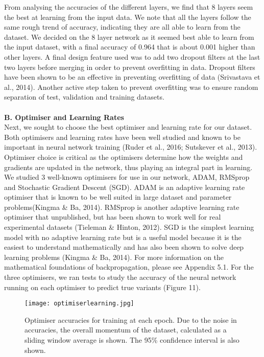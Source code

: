 \documentclass{article}
\begin{document}
From analysing the accuracies of the different layers, we find that 8 layers seem the best at learning from the input data. We note that all the layers follow the same rough trend of accuracy, indicating they are all able to learn from the dataset. We decided on the 8 layer network as it seemed best able to learn from the input dataset, with a final accuracy of 0.964 that is about 0.001 higher than other layers. A final design feature used was to add two dropout filters at the last two layers before merging in order to prevent overfitting in data. Dropout filters have been shown to be an effective in preventing overfitting of data (Srivastava et al., 2014). Another active step taken to prevent overfitting was to ensure random separation of test, validation and training datasets.\\\\
\textbf{B. Optimiser and Learning Rates}\\
Next, we sought to choose the best optimiser and learning rate for our dataset. Both optimisers and learning rates have been well studied and known to be important in neural network training (Ruder et al., 2016; Sutskever et al., 2013). Optimiser choice is critical as the optimisers determine how the weights and gradients are updated in the network, thus playing an integral part in learning. We studied 3 well-known optimisers for use in our network, ADAM, RMSprop and Stochastic Gradient Descent (SGD). ADAM is an adaptive learning rate optimiser that is known to be well suited in large dataset and parameter problems(Kingma \& Ba, 2014). RMSprop is another adaptive learning rate optimiser that unpublished, but has been shown to work well for real experimental datasets (Tieleman \& Hinton, 2012). SGD is the simplest learning model with no adaptive learning rate but is a useful model because it is the easiest to understand mathematically and has also been shown to solve deep learning problems (Kingma \& Ba, 2014). For more information on the mathematical foundations of backpropagation, please see Appendix 5.1. For the three optimisers, we ran tests to study the accuracy of the neural network running on each optimiser to predict true variants (Figure 11).
\begin{figure}[H]
\texttt{[image: optimiserlearning.jpg]}
\centering
\caption{Optimiser accuracies for training at each epoch. Due to the noise in accuracies, the overall momentum of the dataset, calculated as a sliding window average is shown. The 95\% confidence interval is also shown.}
\end{figure}
\end{document}
